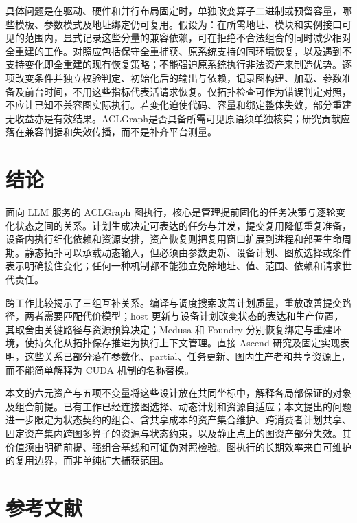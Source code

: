 \documentclass[
  UTF8,
  zihao=5]{ctexart}
\begin{document}
具体问题是在驱动、硬件和并行布局固定时，单独改变算子二进制或预留容量，哪些模板、参数模式及地址绑定仍可复用。假设为：在所需地址、模块和实例接口可见的范围内，显式记录这些分量的兼容依赖，可在拒绝不合法组合的同时减少相对全重建的工作。对照应包括保守全重捕获、原系统支持的同环境恢复，以及遇到不支持变化即全重建的现有恢复策略；不能强迫原系统执行非法资产来制造优势。逐项改变条件并独立校验判定、初始化后的输出与依赖，记录图构建、加载、参数准备及前台时间，不用这些指标代表活请求恢复。仅拓扑检查可作为错误判定对照，不应让已知不兼容图实际执行。若变化迫使代码、容量和绑定整体失效，部分重建无收益亦是有效结果。ACLGraph是否具备所需可见原语须单独核实；研究贡献应落在兼容判据和失效传播，而不是补齐平台测量。

\hypertarget{ux7ed3ux8bba}{%
\section{结论}\label{ux7ed3ux8bba}}

面向 LLM 服务的 ACLGraph
图执行，核心是管理提前固化的任务决策与逐轮变化状态之间的关系。计划生成决定可表达的任务与并发，提交复用降低重复准备，设备内执行细化依赖和资源安排，资产恢复则把复用窗口扩展到进程和部署生命周期。静态拓扑可以承载动态输入，但必须由参数更新、设备计划、图族选择或条件表示明确接住变化；任何一种机制都不能独立免除地址、值、范围、依赖和请求世代责任。

跨工作比较揭示了三组互补关系。编译与调度搜索改善计划质量，重放改善提交路径，两者需要匹配代价模型；host
更新与设备计划改变状态的表达和生产位置，其取舍由关键路径与资源预算决定；Medusa
和 Foundry
分别恢复绑定与重建环境，使持久化从拓扑保存推进为执行上下文管理。直接
Ascend
研究及固定实现表明，这些关系已部分落在参数化、partial、任务更新、图内生产者和共享资源上，而不能简单解释为
CUDA 机制的名称替换。

本文的六元资产与五项不变量将这些设计放在共同坐标中，解释各局部保证的对象及组合前提。已有工作已经连接图选择、动态计划和资源自适应；本文提出的问题进一步限定为状态契约的组合、含共享成本的资产集合维护、跨消费者计划共享、固定资产集内跨图多算子的资源与状态约束，以及静止点上的图资产部分失效。其价值须由明确前提、强组合基线和可证伪对照检验。图执行的长期效率来自可维护的复用边界，而非单纯扩大捕获范围。

\hypertarget{ux53c2ux8003ux6587ux732e}{%
\section*{参考文献}\label{ux53c2ux8003ux6587ux732e}}
\end{document}
